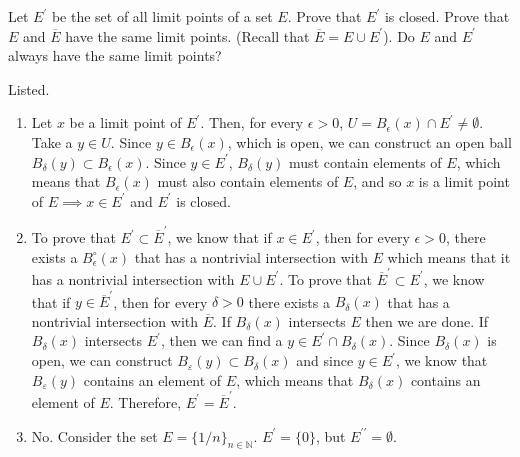 \documentclass{article}
\begin{document}
    \begin{exercise}[Rudin 2.6]
    Let $E^\prime$ be the set of all limit points of a set $E$. Prove that $E^\prime$ is closed. Prove that $E$ and $\overline{E}$ have the same limit points. (Recall that $\overline{E} = E \cup E^\prime$). Do $E$ and $E^\prime$ always have the same limit points? 
    \end{exercise}
    \begin{solution}
    Listed. 
    \begin{enumerate}
        \item Let $x$ be a limit point of $E^\prime$. Then, for every $\epsilon > 0$, $U = B_\epsilon (x) \cap E^\prime \neq \emptyset$. Take a $y \in U$. Since $y \in B_\epsilon (x)$, which is open, we can construct an open ball $B_\delta (y) \subset B_\epsilon (x)$. Since $y \in E^\prime$, $B_\delta (y)$ must contain elements of $E$, which means that $B_\epsilon (x)$ must also contain elements of $E$, and so $x$ is a limit point of $E \implies x \in E^\prime$ and $E^\prime$ is closed. 

        \item To prove that $E^\prime \subset \overline{E}^\prime$, we know that if $x \in E^\prime$, then for every $\epsilon > 0$, there exists a $B_\epsilon ^\circ (x)$ that has a nontrivial intersection with $E$ which means that it has a nontrivial intersection with $E \cup E^\prime$. To prove that $\overline{E}^\prime \subset E^\prime$, we know that if $y \in \overline{E}^\prime$, then for every $\delta > 0$ there exists a $B_\delta (x)$ that has a nontrivial intersection with $\overline{E}$. If $B_\delta (x)$ intersects $E$ then we are done. If $B_\delta (x)$ intersects $E^\prime$, then we can find a $y \in E^\prime \cap B_\delta (x)$. Since $B_\delta (x)$ is open, we can construct $B_\varepsilon (y) \subset B_\delta (x)$ and since $y \in E^\prime$, we know that $B_\varepsilon (y)$ contains an element of $E$, which means that $B_\delta (x)$ contains an element of $E$. Therefore, $E^\prime = \overline{E}^\prime$. 

        \item No. Consider the set $E = \{1/n\}_{n \in \mathbb{N}}$. $E^\prime = \{0\}$, but $E^{\prime\prime} = \emptyset$. 
    \end{enumerate}
    \end{solution}
\end{document}
